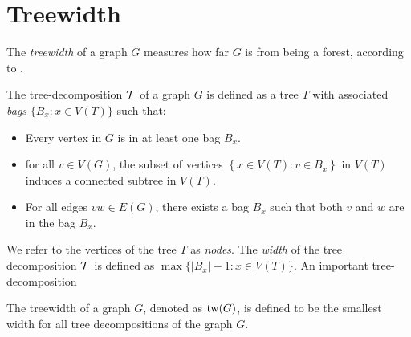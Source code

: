 \section{Treewidth}\label{sec:treewidth}

The \textit{treewidth} of a graph \(G\) measures how far \(G\) is from being a forest, according to \textcite{diestelGraphMinors2017}.

\begin{definition}\label{def:tree-decomposition}
	The tree-decomposition \(\mathcal{T}\) of a graph \(G\) is defined as a tree \(T\) with associated \textit{bags} \(\lbrace B_x : x \in V(T) \rbrace\) such that:
	\begin{itemize}
		\item Every vertex in \(G\) is in at least one bag \(B_x\).
		\item for all \(v \in V(G)\), the subset of vertices \(\left\lbrace x \in V(T): v \in B_x \right\rbrace\) in \(V(T)\) induces a connected subtree in \(V(T)\).
		\item For all edges \(vw \in E(G)\), there exists a bag \(B_x\) such that both \(v\) and \(w\) are in the bag \(B_x\).
	\end{itemize}
\end{definition}
We refer to the vertices of the tree \(T\) as \textit{nodes}.
The \textit{width} of the tree decomposition \(\mathcal{T}\) is defined as \(\max \lbrace |B_x| - 1 : x \in V(T) \rbrace\). An important tree-decomposition

\begin{definition}\label{def:treewidth}
	The treewidth of a graph \(G\), denoted as \(\operatorname{tw}(G)\), is defined to be the smallest width for all tree decompositions of the graph \(G\).
\end{definition}


